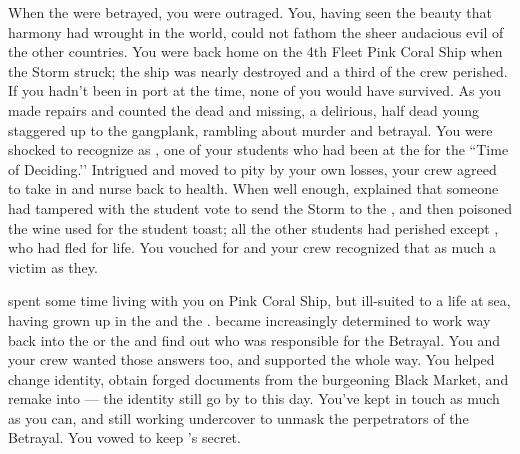 \documentclass[char]{GL2020}
\begin{document}
When the \pShip{} were betrayed, you were outraged. You, having seen the beauty that harmony had wrought in the world, could not fathom the sheer audacious evil of the other countries. You were back home on the 4th Fleet Pink Coral Ship when the Storm struck; the ship was nearly destroyed and a third of the crew perished. If you hadn't been in port at the time, none of you would have survived. As you made repairs and counted the dead and missing, a delirious, half dead young \cKidScientist{\person} staggered up to the gangplank, rambling about murder and betrayal. You were shocked to recognize \cKidScientist{\them} as \cKidScientist{\full}, one of your students who had been at the \pSchool{} for the ``Time of Deciding.’’ Intrigued and moved to pity by your own losses, your crew agreed to take \cKidScientist{\them} in and nurse \cKidScientist{\them} back to health. When \cKidScientist{\they} \cKidScientist{\were} well enough, \cKidScientist{} explained that someone had tampered with the student vote to send the Storm to the \pShip{}, and then poisoned the wine used for the student toast; all the other students had perished except \cKidScientist{}, who had fled for \cKidScientist{\their} life. You vouched for \cKidScientist{\them} and your crew recognized that \cKidScientist{\they} \cKidScientist{\were} as much a victim as they. 

\cKidScientist{} spent some time living with you on Pink Coral Ship, but \cKidScientist{\they} \cKidScientist{\were} ill-suited to a life at sea, having grown up in the \pTech{} and the \pFarm{}. \cKidScientist{\They} became increasingly determined to work \cKidScientist{\their} way back into the \pFarm{} or the \pTech{} and find out who was responsible for the Betrayal. You and your crew wanted those answers too, and supported \cKidScientist{\them} the whole way. You helped \cKidScientist{\them} change \cKidScientist{\their} identity, obtain forged documents from the burgeoning Black Market, and remake \cKidScientist{\them} into \cAssistantScientist{\full} — the identity \cKidScientist{\they} still go\cKidScientist{\verbes} by to this day. You’ve kept in touch as much as you can, and \cKidScientist{\they} \cKidScientist{\are} still working undercover to unmask the perpetrators of the Betrayal. You vowed to keep \cKidScientist{}’s secret.
\end{document}
